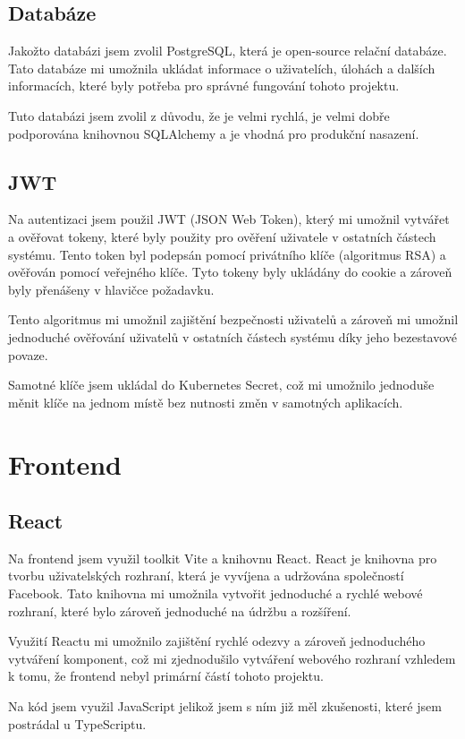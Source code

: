 \documentclass[12pt, a4paper,
oneside,      %
openright
]{report}
\begin{document}
\subsection{Databáze}
Jakožto databázi jsem zvolil PostgreSQL, která je open-source relační databáze. Tato databáze mi umožnila ukládat informace o uživatelích, úlohách a dalších informacích, které byly potřeba pro správné fungování tohoto projektu. 

Tuto databázi jsem zvolil z důvodu, že je velmi rychlá, je velmi dobře podporována knihovnou SQLAlchemy a je vhodná pro produkční nasazení.

\subsection{JWT}
Na autentizaci jsem použil JWT (JSON Web Token), který mi umožnil vytvářet a ověřovat tokeny, které byly použity pro ověření uživatele v ostatních částech systému. Tento token byl podepsán pomocí privátního klíče (algoritmus RSA) a ověřován pomocí veřejného klíče. Tyto tokeny byly ukládány do cookie a zároveň byly přenášeny v hlavičce požadavku.

Tento algoritmus mi umožnil zajištění bezpečnosti uživatelů a zároveň mi umožnil jednoduché ověřování uživatelů v ostatních částech systému díky jeho bezestavové povaze.

Samotné klíče jsem ukládal do Kubernetes Secret, což mi umožnilo jednoduše měnit klíče na jednom místě bez nutnosti změn v samotných aplikacích.


\section{Frontend}
\subsection{React}
Na frontend jsem využil toolkit Vite a knihovnu React. React je knihovna pro tvorbu uživatelských rozhraní, která je vyvíjena a udržována společností Facebook. Tato knihovna mi umožnila vytvořit jednoduché a rychlé webové rozhraní, které bylo zároveň jednoduché na údržbu a rozšíření.

Využití Reactu mi umožnilo zajištění rychlé odezvy a zároveň jednoduchého vytváření komponent, což mi zjednodušilo vytváření webového rozhraní vzhledem k tomu, že frontend nebyl primární částí tohoto projektu.

Na kód jsem využil JavaScript jelikož jsem s ním již měl zkušenosti, které jsem postrádal u TypeScriptu.
\end{document}
